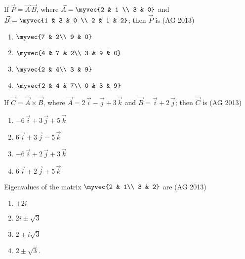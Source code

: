 \item If $\vec P = \vec A\,\vec B$, where $\displaystyle \vec A = \myvec{2 & 1 \\ 3 & 0}$ and $\displaystyle \vec B = \myvec{1 & 3 & 0 \\ 2 & 1 & 2}$; then $\vec P$ is
\hfill(AG 2013)
\begin{multicols}{4}
\begin{enumerate}
    \item $\myvec{7 & 2\\ 9 & 0}$
    \item $\myvec{4 & 7 & 2\\ 3 & 9 & 0}$ 
    \item $\myvec{2 & 4\\ 3 & 9}$ 
    \item $\myvec{2 & 4 & 7\\ 0 & 3 & 9}$
\end{enumerate}
\end{multicols}
\item If $\vec C = \vec A \times \vec B$, where $\vec A = 2\,\vec i - \vec j + 3\,\vec k$ and $\vec B = \vec i + 2\,\vec j$; then $\vec C$ is
\hfill(AG 2013)
\begin{multicols}{4}
\begin{enumerate}
    \item  $-6\,\vec i + 3\,\vec j + 5\,\vec k$ 
    \item  $6\,\vec i + 3\,\vec j - 5\,\vec k$ 
    \item $-6\,\vec i + 2\,\vec j + 3\,\vec k$ 
    \item $6\,\vec i + 2\,\vec j + 5\,\vec k$
\end{enumerate}
\end{multicols}
\item Eigenvalues of the matrix $\myvec{2 & 1\\ 3 & 2}$ are
\hfill(AG 2013)
\begin{multicols}{4}
 \begin{enumerate}
     \item  $\pm 2i$ 
     \item  $2i\pm \sqrt{3}\,$
     \item  $2 \pm i\sqrt3$
     \item  $2 \pm \sqrt3$.
 \end{enumerate}   
\end{multicols}
